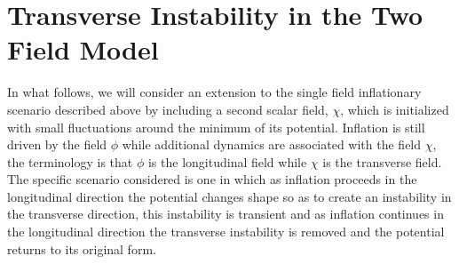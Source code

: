 \documentclass[letterpaper,11pt]{article}
\begin{document}

\section{Transverse Instability in the Two Field Model} \label{two field}


In what follows, we will consider an extension to the single field inflationary scenario described above by including a second scalar field, $\chi$, which is initialized with small fluctuations around the minimum of its potential. Inflation is still driven by the field $\phi$ while additional dynamics are associated with the field $\chi$, the terminology is that $\phi$ is the longitudinal field while $\chi$ is the transverse field. The specific scenario considered is one in which as inflation proceeds in the longitudinal direction the potential changes shape so as to create an instability in the transverse direction, this instability is transient and as inflation continues in the longitudinal direction the transverse instability is removed and the potential returns to its original form.

\end{document}
